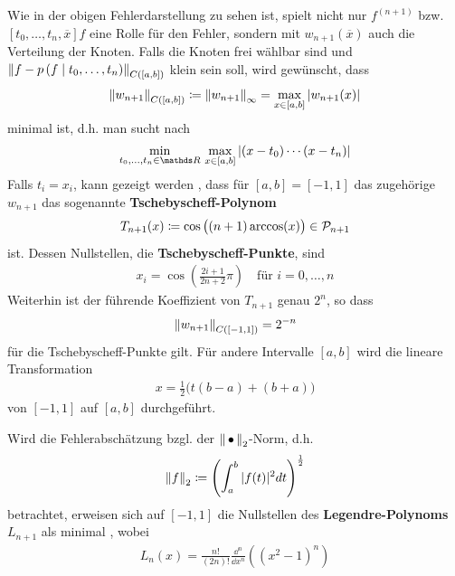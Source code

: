 Wie in der obigen Fehlerdarstellung zu sehen ist,
spielt nicht nur $f^{(n+1)}$ bzw.
$[t_0,\dotsc,t_n, \overline{x}]f$ eine Rolle für den Fehler,
sondern mit $w_{n+1}(\overline{x})$ auch die Verteilung der Knoten.
Falls die Knoten frei wählbar sind und
$\nn[f-\ipol{p}{f}{t_0,\dotsc,t_n}]_{C([a,b])}$
klein sein soll, wird gewünscht, dass
\begin{gather*}\index{Norm}
  \nn[w_{n+1}]_{C([a,b])}\coloneqq \nn[w_{n+1}]_\infty
  = \max_{x\in[a,b]}|w_{n+1}(x)|
\end{gather*}
minimal ist, d.h. man sucht nach
\begin{gather*}
  \min_{t_0,\dotsc,t_n\in\R}\,\max_{x\in[a,b]}
  |(x-t_0)\dotsm(x-t_n)|
\end{gather*}
Falls $t_i=x_i$, kann gezeigt werden 
\cite[z.B.][]{deuflhardhohmann,freundhoppe},
dass für $[a,b]=[-1,1]$ das zugehörige $w_{n+1}$
das sogenannte
\textbf{Tschebyscheff-Polynom}
\begin{gather}
  T_{n+1}(x)\coloneqq \cos\big((n+1)\arccos(x)\big)\in\p_{n+1}
  \label{VI.1.24}
\end{gather}
ist. Dessen Nullstellen, die 
\textbf{Tschebyscheff-Punkte}, sind
\begin{gather}
  x_i= \cos\left(\frac{2i+1}{2n+2}\pi\right)\quad \text{für } i=0,\dotsc,n
  \label{VI.1.25}
\end{gather}
Weiterhin ist der führende Koeffizient von 
$T_{n+1}$ genau $2^n$, so dass 
\begin{gather}
  \nn[w_{n+1}]_{C([-1,1])}=2^{-n}
  \label{VI.1.26}
\end{gather}
für die Tschebyscheff-Punkte gilt.
Für andere Intervalle $[a,b]$ wird die lineare Transformation
\begin{gather*}
  x=\frac{1}{2}\big(t(b-a)+(b+a)\big)
\end{gather*}
von $[-1,1]$ auf $[a,b]$ durchgeführt.

Wird die Fehlerabschätzung bzgl. der 
$\nn_2$-Norm,
d.h. 
\begin{gather*}
  \nn[f]_2\coloneqq \left(\int_{a}^{b}|f(t)|^2dt \right)^\frac{1}{2}
\end{gather*}
betrachtet, erweisen sich auf $[-1,1]$ die Nullstellen
des \textbf{Legendre-Polynoms} $L_{n+1}$
als minimal \cite{haemmerlinhoffmann}, wobei
\begin{gather*}
  L_n(x) = \frac{n!}{(2n)!}\frac{\dd^n}{\dd x^n}\left((x^2-1)^n\right)
\end{gather*}


